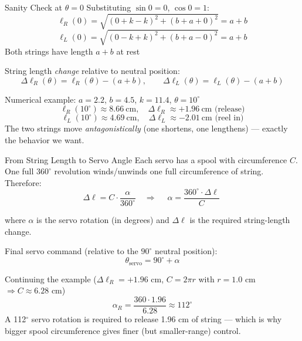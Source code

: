 \documentclass[10pt]{beamer}
\begin{document}
\begin{frame}{Sanity Check at $\theta = 0$}
  Substituting $\sin 0 = 0$, $\cos 0 = 1$:
  \[
    \ell_R(0) = \sqrt{(0 + k - k)^2 + (b + a + 0)^2} = a + b
  \]
  \[
    \ell_L(0) = \sqrt{(0 - k + k)^2 + (b + a - 0)^2} = a + b
  \]
  Both strings have length $a + b$ at rest \checkmark

  \medskip
  String length \emph{change} relative to neutral position:
  \[
    \Delta\ell_R(\theta) = \ell_R(\theta) - (a + b),
    \qquad
    \Delta\ell_L(\theta) = \ell_L(\theta) - (a + b)
  \]

  \begin{block}{Numerical example: $a=2.2$, $b=4.5$, $k=11.4$, $\theta=10^\circ$}
    \footnotesize
    \[
      \ell_R(10^\circ) \approx 8.66\ \text{cm},
      \quad \Delta\ell_R \approx +1.96\ \text{cm} \text{ (release)}
    \]
    \[
      \ell_L(10^\circ) \approx 4.69\ \text{cm},
      \quad \Delta\ell_L \approx -2.01\ \text{cm} \text{ (reel in)}
    \]
    The two strings move \emph{antagonistically} (one shortens, one lengthens) — exactly the behavior we want.
  \end{block}
\end{frame}

\begin{frame}{From String Length to Servo Angle}
  Each servo has a spool with circumference $C$. One full $360^\circ$ revolution winds/unwinds one full circumference of string. Therefore:
  \[
    \Delta\ell = C \cdot \frac{\alpha}{360^\circ}
    \quad \Longrightarrow \quad
    \boxed{\;\alpha = \frac{360^\circ \cdot \Delta\ell}{C}\;}
  \]

  where $\alpha$ is the servo rotation (in degrees) and $\Delta\ell$ is the required string-length change.

  \medskip
  Final servo command (relative to the $90^\circ$ neutral position):
  \[
    \theta_{\text{servo}} = 90^\circ + \alpha
  \]

  \begin{block}{Continuing the example ($\Delta\ell_R = +1.96$ cm, $C = 2\pi r$ with $r = 1.0$ cm $\Rightarrow C \approx 6.28$ cm)}
    \footnotesize
    \[
      \alpha_R = \frac{360 \cdot 1.96}{6.28} \approx 112^\circ
    \]
    A 112$^\circ$ servo rotation is required to release 1.96 cm of string — which is why bigger spool circumference gives finer (but smaller-range) control.
  \end{block}
\end{frame}


\end{document}
